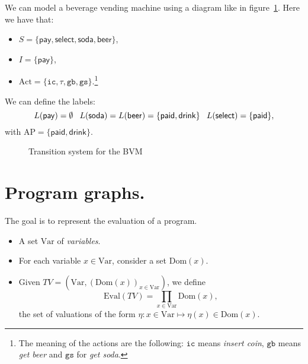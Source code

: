 \documentclass[./main]{subfiles}
\begin{document}
  \begin{exm}
    We can model a beverage vending machine using a diagram like in figure~\ref{fig:bvm-ts}.
    Here we have that:
    \begin{itemize}
      \item $S = \{\mathsf{pay}, \mathsf{select}, \mathsf{soda}, \mathsf{beer}\}$,
      \item $I = \{\mathsf{pay}\}$,
      \item $\mathrm{Act} = \{\mathtt{ic}, \tau, \mathtt{gb}, \mathtt{gs}\}$.\footnote{The meaning of the actions are the following: $\mathtt{ic}$ means \textit{insert coin}, $\mathtt{gb}$ means \textit{get beer} and $\mathtt{gs}$ for \textit{get soda}.}
    \end{itemize}
    We can define the labels:
    \[
    \scriptsize L(\mathsf{pay}) = \emptyset \quad L(\mathsf{soda}) = L(\mathsf{beer}) = \{\mathsf{paid}, \mathsf{drink}\}  \quad L(\mathsf{select}) = \{\mathsf{paid}\}
    ,\]
    with $\mathrm{AP} = \{\mathsf{paid}, \mathsf{drink}\}$.
  \end{exm}
  \begin{figure}
    \centering
    \caption{Transition system for the BVM}
    \label{fig:bvm-ts}
  \end{figure}

  \section{Program graphs.}

  The goal is to represent the evaluation of a program.

  \begin{defn}
    \begin{itemize}
      \item A set $\mathrm{Var}$ of \textit{variables}.
      \item For each variable $x \in \mathrm{Var}$, consider a set $\mathrm{Dom}(x)$.
      \item Given $TV = (\mathrm{Var}, (\mathrm{Dom}(x))_{x \in \mathrm{Var}})$, we define
        \[
          \mathrm{Eval}(TV) = \prod_{x \in \mathrm{Var}} \mathrm{Dom}(x)
        ,\]
        the set of valuations of the form $\eta : x \in \mathrm{Var} \mapsto \eta(x) \in \mathrm{Dom}(x)$.
    \end{itemize}
  \end{defn}
\end{document}

